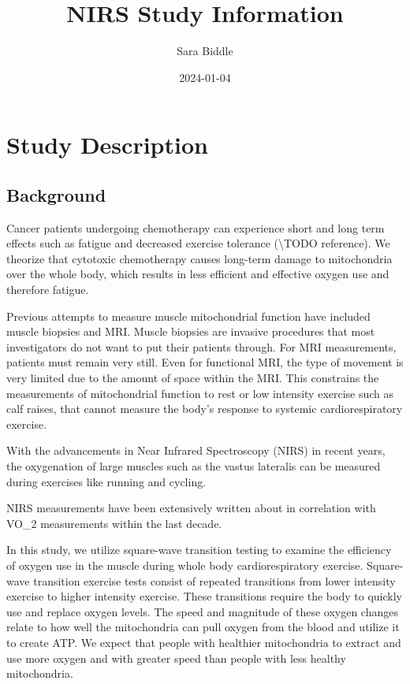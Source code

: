 \documentclass[
]{book}
\title{NIRS Study Information}
\author{Sara Biddle}
\date{2024-01-04}
\begin{document}
\maketitle

{
\setcounter{tocdepth}{1}
\tableofcontents
}
\hypertarget{intro}{%
\chapter{Study Description}\label{intro}}

\hypertarget{background}{%
\section{Background}\label{background}}

Cancer patients undergoing chemotherapy can experience short and long term effects such as fatigue and decreased exercise tolerance (\textbackslash TODO reference). We theorize that cytotoxic chemotherapy causes long-term damage to mitochondria over the whole body, which results in less efficient and effective oxygen use and therefore fatigue.

Previous attempts to measure muscle mitochondrial function have included muscle biopsies and MRI. Muscle biopsies are invasive procedures that most investigators do not want to put their patients through. For MRI measurements, patients must remain very still. Even for functional MRI, the type of movement is very limited due to the amount of space within the MRI. This constrains the measurements of mitochondrial function to rest or low intensity exercise such as calf raises, that cannot measure the body's response to systemic cardiorespiratory exercise.

With the advancements in Near Infrared Spectroscopy (NIRS) in recent years, the oxygenation of large muscles such as the vastus lateralis can be measured during exercises like running and cycling.

NIRS measurements have been extensively written about in correlation with VO\_2 measurements within the last decade.

In this study, we utilize square-wave transition testing to examine the efficiency of oxygen use in the muscle during whole body cardiorespiratory exercise. Square-wave transition exercise tests consist of repeated transitions from lower intensity exercise to higher intensity exercise. These transitions require the body to quickly use and replace oxygen levels. The speed and magnitude of these oxygen changes relate to how well the mitochondria can pull oxygen from the blood and utilize it to create ATP. We expect that people with healthier mitochondria to extract and use more oxygen and with greater speed than people with less healthy mitochondria.
\end{document}
